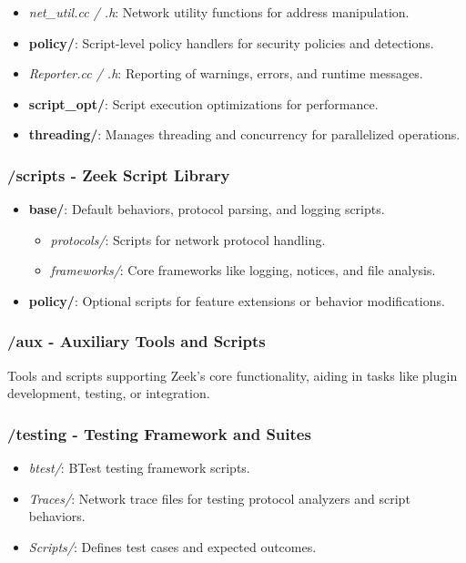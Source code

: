 \begin{itemize}
    \item \emph{net\_util.cc / .h}: Network utility functions for address manipulation.

    \item \textbf{policy/}: Script-level policy handlers for security policies and detections.

    \item \emph{Reporter.cc / .h}: Reporting of warnings, errors, and runtime messages.

    \item \textbf{script\_opt/}: Script execution optimizations for performance.

    \item \textbf{threading/}: Manages threading and concurrency for parallelized operations.
\end{itemize}

\subsubsection{/scripts - Zeek Script Library}
\begin{itemize}
    \item \textbf{base/}: Default behaviors, protocol parsing, and logging scripts.
    \begin{itemize}
        \item \emph{protocols/}: Scripts for network protocol handling.
        \item \emph{frameworks/}: Core frameworks like logging, notices, and file analysis.
    \end{itemize}
    \item \textbf{policy/}: Optional scripts for feature extensions or behavior modifications.
\end{itemize}

\subsubsection{/aux - Auxiliary Tools and Scripts}
Tools and scripts supporting Zeek's core functionality, aiding in tasks like plugin development, testing, or integration.

\subsubsection{/testing - Testing Framework and Suites}
\begin{itemize}
    \item \emph{btest/}: BTest testing framework scripts.
    \item \emph{Traces/}: Network trace files for testing protocol analyzers and script behaviors.
    \item \emph{Scripts/}: Defines test cases and expected outcomes.
\end{itemize}

